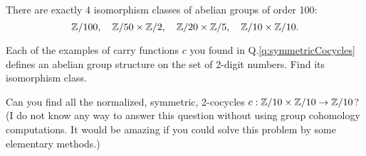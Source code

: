 There are exactly 4 isomorphism classes of abelian groups of order 100:
  \begin{equation*}
    \mathbb{Z}/100,\quad \mathbb{Z}/50 \times \mathbb{Z}/2, \quad \mathbb{Z}/20 \times \mathbb{Z}/5, \quad \mathbb{Z}/10 \times \mathbb{Z}/10.
  \end{equation*}

\begin{qbox}
  Each of the examples of carry functions $c$ you found in Q.\ref{q:symmetricCocycles} defines an abelian group structure on the set of 2-digit numbers. Find its isomorphism class.
\end{qbox}

\begin{qbox}
  Can you find all the normalized, symmetric, 2-cocycles $c:\mathbb{Z}/10 \times \mathbb{Z}/10 \rightarrow \mathbb{Z}/10$? (I do not know any way to answer this question without using group cohomology computations. It would be amazing if you could solve this problem by some elementary methods.)
\end{qbox}
